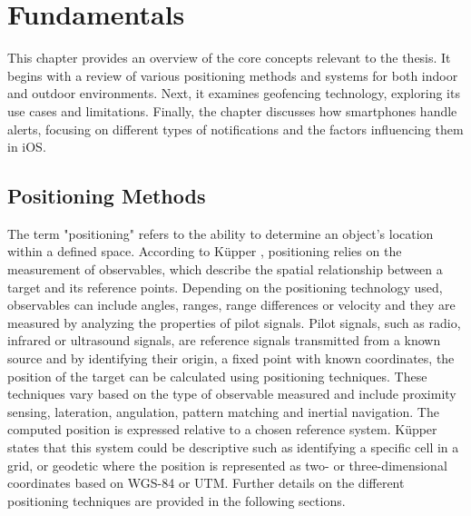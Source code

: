 \chapter{Fundamentals}
\label{cha:Fundamentals}

This chapter provides an overview of the core concepts relevant to the thesis. 
It begins with a review of various positioning methods and systems for both indoor and outdoor environments. 
Next, it examines geofencing technology, exploring its use cases and limitations. 
Finally, the chapter discusses how smartphones handle alerts, focusing on different types of notifications and the factors influencing them in iOS.

\section{Positioning Methods}
\label{sec:methods}
The term "positioning" refers to the ability to determine an object's location within a defined space. According to K\"upper \cite{kupper2005location}, positioning relies on the measurement of observables, which describe the spatial relationship between a target and its reference points. 
Depending on the positioning technology used, observables can include angles, ranges, range differences or velocity and they are measured by analyzing the properties of pilot signals. 
Pilot signals, such as radio, infrared or ultrasound signals, are reference signals transmitted from a known source and by identifying their origin, a fixed point with known coordinates, the position of the target can be calculated using positioning techniques. 
These techniques vary based on the type of observable measured and include proximity sensing, lateration, angulation, pattern matching and inertial navigation.
The computed position is expressed relative to a chosen reference system. K\"upper \cite{kupper2005location} states that this system could be descriptive such as identifying a specific cell in a grid, or geodetic where the position is represented as two- or three-dimensional coordinates based on WGS-84 or UTM. 
Further details on the different positioning techniques are provided in the following sections.

